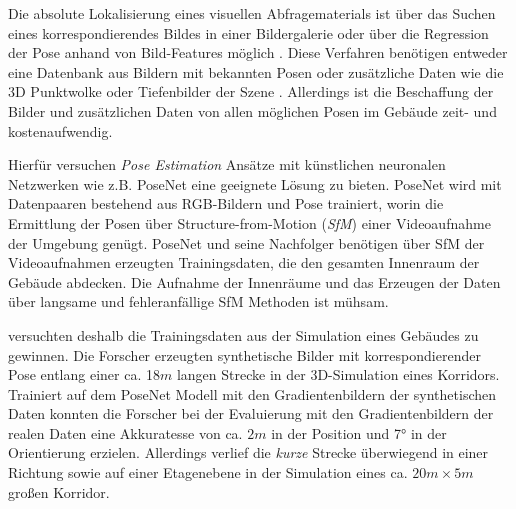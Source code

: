 Die absolute Lokalisierung eines visuellen Abfragematerials ist über das Suchen eines korrespondierendes Bildes in einer Bildergalerie oder über die Regression der Pose anhand von Bild-Features möglich \cite{piascoSurveyVisualBasedLocalization2018}. Diese Verfahren benötigen entweder eine Datenbank aus Bildern mit bekannten Posen \cite{zhangImageBasedLocalization2006, arandjelovicThreeThingsEveryone2012, radenovicCNNImageRetrieval2016} oder zusätzliche Daten wie die 3D Punktwolke \cite{irscharaStructurefrommotionPointClouds2009, liWorldwidePoseEstimation2012, svarmCityScaleLocalizationCameras2017} oder Tiefenbilder der Szene \cite{shottonSceneCoordinateRegression2013a}. Allerdings ist die Beschaffung der Bilder und zusätzlichen Daten von allen möglichen Posen im Gebäude zeit- und kostenaufwendig.


Hierfür versuchen \textit{Pose Estimation} Ansätze mit künstlichen neuronalen Netzwerken wie z.B. PoseNet \cite{kendallPoseNetConvolutionalNetwork2015} eine geeignete Lösung zu bieten. PoseNet wird mit Datenpaaren bestehend aus RGB-Bildern und Pose trainiert, worin die Ermittlung der Posen über Structure-from-Motion (\textit{SfM}) einer Videoaufnahme der Umgebung genügt. PoseNet und seine Nachfolger \cite{kendallModellingUncertaintyDeep2015a, walchImagebasedLocalizationUsing2016,  kendallGeometricLossFunctions2017,  clarkVidLocDeepSpatioTemporal2017} benötigen über SfM der Videoaufnahmen erzeugten Trainingsdaten, die den gesamten Innenraum der Gebäude abdecken. Die Aufnahme der Innenräume und das Erzeugen der Daten über langsame und fehleranfällige SfM Methoden ist mühsam.

\citet{acharyaBIMPoseNetIndoorCamera2019} versuchten deshalb die Trainingsdaten aus der Simulation eines Gebäudes zu gewinnen. Die Forscher erzeugten synthetische Bilder mit korrespondierender Pose entlang einer ca. 18$m$ langen Strecke in der 3D-Simulation eines Korridors. Trainiert auf dem PoseNet Modell mit den Gradientenbildern der synthetischen Daten konnten die Forscher \citet{acharyaBIMPoseNetIndoorCamera2019} bei der Evaluierung mit den Gradientenbildern der realen Daten eine Akkuratesse von ca. $2m$ in der Position und 7° in der Orientierung erzielen. Allerdings verlief die \textit{kurze} Strecke überwiegend in einer Richtung sowie auf einer Etagenebene in der Simulation eines ca. $20m \times 5m$ großen Korridor.


